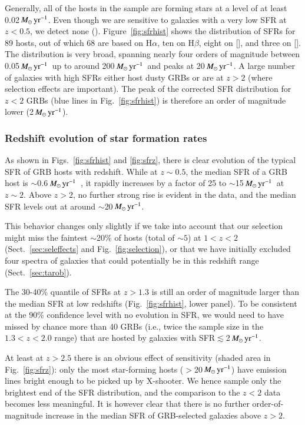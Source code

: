 \documentclass[traditabstract, longauth]{aa}
\newcommand{\hb}{H$\beta$}
\newcommand{\ha}{H$\alpha$}
\newcommand{\oii}{[\ion{O}{ii}]}
\newcommand{\oiii}{[\ion{O}{iii}]}
\newcommand{\Msunyr}{$M_\odot\,\rm{yr}^{-1}$}
\begin{document}
Generally, all of the hosts in the sample are forming stars at a level of at least 0.02\,\Msunyr. Even though we are sensitive to galaxies with a very low SFR at $z<0.5$, we detect none (\citealp[but see][for a quiescent galaxy at the position of a GRB~050219A]{2014A&A...572A..47R}). Figure~\ref{fig:sfrhist} shows the distribution of SFRs for 89 hosts, out of which 68 are based on \ha, ten on \hb, eight on \oii, and three on \oiii. The distribution is very broad, spanning nearly four orders of magnitude between 0.05\,\Msunyr\, up to around 200\,\Msunyr\, and peaks at 20\,\Msunyr.  {A large number of galaxies with high SFRs either host dusty GRBs or are at $z>2$ (where selection effects are important). The peak of the corrected SFR distribution for $z<2$ GRBs (blue lines in Fig.~\ref{fig:sfrhist}) is therefore an order of magnitude lower (2\,\Msunyr).} 

\subsubsection{Redshift evolution of star formation rates}

As shown in Figs.~\ref{fig:sfrhist} and \ref{fig:sfrz}, there is clear evolution of the typical SFR of GRB hosts with redshift. While at $z\sim0.5$, the median SFR of a GRB host is $\sim0.6$\,\Msunyr\, \citep[see also][]{2009ApJ...691..182S}, it rapidly increases by a factor of 25 to $\sim$15\,\Msunyr\, at $z\sim2$. Above $z>2$, no further strong rise is evident in the data, and the median SFR levels out at around $\sim$20\,\Msunyr. 

 {This behavior changes only slightly if we take into account that our selection might miss the faintest $\sim$20\% of hosts (total of $\sim5$) at $1<z<2$ (Sect.~\ref{sec:seleffects} and Fig.~\ref{fig:selection}), or that we have initially excluded four spectra of galaxies that could potentially be in this redshift range (Sect.~\ref{sec:tarob})}. 

 {The 30-40\% quantile of SFRs at $z > 1.3$ is still an order of magnitude larger than the median SFR at low redshifts (Fig.~\ref{fig:sfrhist}, lower panel). To be consistent at the 90\% confidence level with no evolution in SFR, we would need to have missed by chance more than 40 GRBs (i.e., twice the sample size in the $1.3<z<2.0$ range) that are hosted by galaxies with SFR$\lesssim$2\,\Msunyr.}

At least at $z>2.5$ there is an obvious effect of sensitivity (shaded area in Fig.~\ref{fig:sfrz}): only the most star-forming hosts ($>$20\,\Msunyr) have emission lines bright enough to be picked up by X-shooter. We hence sample only the brightest end of the SFR distribution, and the comparison to the $z<2$ data becomes less meaningful. It is however clear that there is no further order-of-magnitude increase in the median SFR of GRB-selected galaxies above $z > 2$. 
\end{document}
